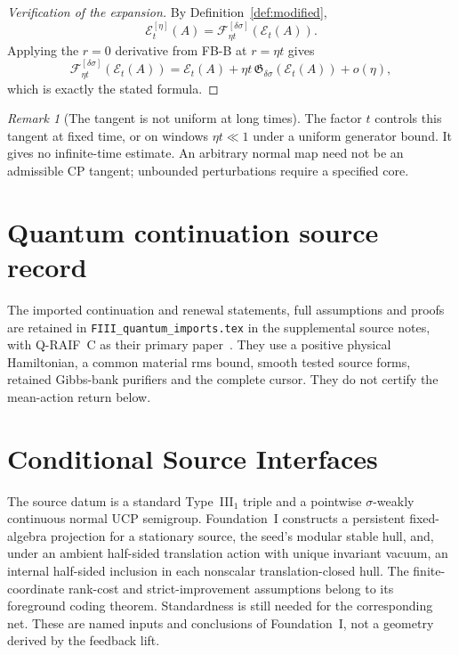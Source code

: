 \documentclass[12pt]{article}
\theoremstyle{definition}
\theoremstyle{remark}
\newtheorem{remark}[theorem]{Remark}
\begin{document}
\begin{proof}[Verification of the expansion]
By Definition~\ref{def:modified},
\[
\mathcal E_t^{[\eta]}(A)
=
\mathscr F_{\eta t}^{[\delta\sigma]}(\mathcal E_t(A)).
\]
Applying the \(r=0\) derivative from FB-B at \(r=\eta t\) gives
\[
\mathscr F_{\eta t}^{[\delta\sigma]}(\mathcal E_t(A))
=
\mathcal E_t(A)
+
\eta t\,\mathfrak G_{\delta\sigma}(\mathcal E_t(A))
+
o(\eta),
\]
which is exactly the stated formula.
\end{proof}

\begin{remark}[The tangent is not uniform at long times]
The factor \(t\) controls this tangent at fixed time, or on windows
\(\eta t\ll1\) under a uniform generator bound. It gives no
infinite-time estimate. An arbitrary normal map need not be an
admissible CP tangent; unbounded perturbations require a specified core.
\end{remark}

\section{Quantum continuation source record}\label{app:quantum_imports}
The imported continuation and renewal statements, full assumptions and
proofs are retained in \texttt{FIII\_quantum\_imports.tex} in the supplemental
source notes, with Q-RAIF~C as their primary paper~\cite{QRAIFC}.
They use a positive physical Hamiltonian, a common material rms bound,
smooth tested source forms, retained Gibbs-bank purifiers and the
complete cursor. They do not certify the mean-action return below.

\section{Conditional Source Interfaces}\label{app:interfaces}

The source datum is a standard Type~III$_1$ triple and a pointwise
$\sigma$-weakly continuous normal UCP semigroup. Foundation~I
constructs a persistent fixed-algebra projection for a stationary
source, the seed's modular stable hull, and, under an ambient
half-sided translation action with unique invariant vacuum, an
internal half-sided inclusion in each nonscalar translation-closed
hull. The finite-coordinate rank-cost and strict-improvement assumptions
belong to its foreground coding theorem. Standardness is still needed
for the corresponding net. These are named inputs and conclusions of
Foundation~I, not a geometry derived by the feedback lift.
\end{document}
